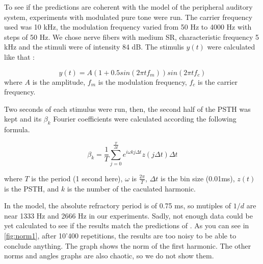 To see if the predictions are coherent with the model of the peripheral auditory 
system, experiments with modulated pure tone were run. 
The carrier frequency used was 10 kHz, the modulation frequency varied from 50 Hz to 4000 Hz
with steps of 50 Hz. We chose nerve fibers with medium SR, characteristic frequency 5 kHz 
and the stimuli were of intensity 84 dB.
The stimulis $y\left(t\right)$ were calculated like that :

\begin{equation}\label{freqstim} y\left(t\right) = A \left(1+0.5sin \left(2 \pi t f_m \right)\right) sin \left(2 \pi t f_c \right)\end{equation} %
where $A$ is the amplitude,
$f_m$ is the modulation frequency,
$f_c$ is the carrier frequency.

 
Two seconds of each stimulus were run, 
then, the second half of the PSTH was kept and its $\beta_k$ Fourier coefficients were calculated according the following formula.

\begin{equation}\label{bkformula} \beta_k = \frac{1}{T} \sum_{j= 0}^{\frac{T}{\Delta t}} e^{i \omega k j \Delta t} z \left( j \Delta t\right)\Delta t\end{equation}

where $T$ is the period (1 second here), %
 $\omega$ is $\frac{2\pi}{T}$,
$\Delta t$ is the bin size (0.01ms),
$z\left(t\right)$ is the PSTH,
and $k$ is the number of the caculated harmonic.

In the model, the absolute refractory period is of 0.75 ms, so mutiples of $1/d$ are near 1333 Hz and 2666 Hz in our experiments.
Sadly, not enough data could be yet calculated to see if the results match the predictions of 
\cite{Deger}. 
As you can see in \autoref{fig:norm1}, after 10'400 repetitions, the results are too noisy to be able to conclude anything. %
The graph shows the norm of the first harmonic. The other norms and angles graphs are also chaotic, so we do not show them.












 